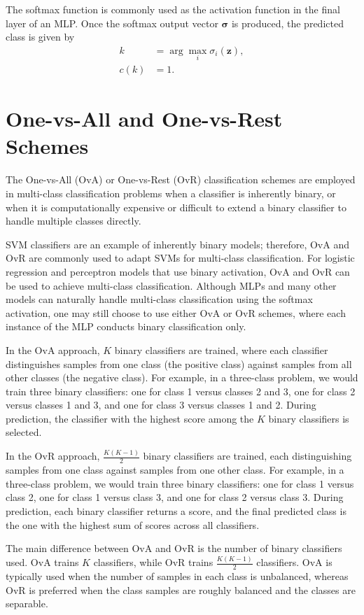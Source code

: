\documentclass[12pt]{article}
\begin{document}
The softmax function is commonly used as the activation function in the final layer of an MLP. Once the softmax output vector \(\bm{\sigma}\) is produced, the predicted class is given by
\begin{align}
    k &= \arg\max_i \sigma_i(\bm{z}), \\
    c(k) &= 1.
\end{align}

\section{One-vs-All and One-vs-Rest Schemes}
The One-vs-All (OvA) or One-vs-Rest (OvR) classification schemes are employed in multi-class classification problems when a classifier is inherently binary, or when it is computationally expensive or difficult to extend a binary classifier to handle multiple classes directly.

SVM classifiers are an example of inherently binary models; therefore, OvA and OvR are commonly used to adapt SVMs for multi-class classification. For logistic regression and perceptron models that use binary activation, OvA and OvR can be used to achieve multi-class classification. Although MLPs and many other models can naturally handle multi-class classification using the softmax activation, one may still choose to use either OvA or OvR schemes, where each instance of the MLP conducts binary classification only.

In the OvA approach, \(K\) binary classifiers are trained, where each classifier distinguishes samples from one class (the positive class) against samples from all other classes (the negative class). For example, in a three-class problem, we would train three binary classifiers: one for class 1 versus classes 2 and 3, one for class 2 versus classes 1 and 3, and one for class 3 versus classes 1 and 2. During prediction, the classifier with the highest score among the \(K\) binary classifiers is selected.

In the OvR approach, \(\frac{K(K-1)}{2}\) binary classifiers are trained, each distinguishing samples from one class against samples from one other class. For example, in a three-class problem, we would train three binary classifiers: one for class 1 versus class 2, one for class 1 versus class 3, and one for class 2 versus class 3. During prediction, each binary classifier returns a score, and the final predicted class is the one with the highest sum of scores across all classifiers.

The main difference between OvA and OvR is the number of binary classifiers used. OvA trains \(K\) classifiers, while OvR trains \(\frac{K(K-1)}{2}\) classifiers. OvA is typically used when the number of samples in each class is unbalanced, whereas OvR is preferred when the class samples are roughly balanced and the classes are separable.
\end{document}
